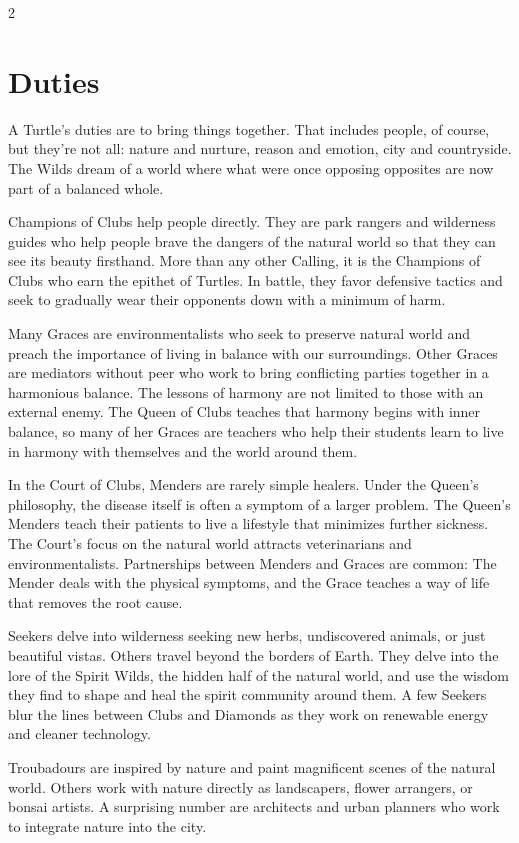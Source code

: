 \begin{multicols}{2}
\section*{Duties}
A Turtle's duties are to bring things together. That includes people, of course, but they're not all: nature and nurture, reason and emotion, city and countryside. The Wilds dream of a world where what were once opposing opposites are now part of a balanced whole. 

Champions of Clubs help people directly. They are park rangers and wilderness guides who help people brave the dangers of the natural world so that they can see its beauty firsthand. More than any other Calling, it is the Champions of Clubs who earn the epithet of Turtles. In battle, they favor defensive tactics and seek to gradually wear their opponents down with a minimum of harm. 

Many Graces are environmentalists who seek to preserve natural world and preach the importance of living in balance with our surroundings. Other Graces are mediators without peer who work to bring conflicting parties together in a harmonious balance. The lessons of harmony are not limited to those with an external enemy. The Queen of Clubs teaches that harmony begins with inner balance, so many of her Graces are teachers who help their students learn to live in harmony with themselves and the world around them. 

In the Court of Clubs, Menders are rarely simple healers. Under the Queen's philosophy, the disease itself is often a symptom of a larger problem. The Queen's Menders teach their patients to live a lifestyle that minimizes further sickness. The Court's focus on the natural world attracts veterinarians and environmentalists. Partnerships between Menders and Graces are common: The Mender deals with the physical symptoms, and the Grace teaches a way of life that removes the root cause. 

Seekers delve into wilderness seeking new herbs, undiscovered animals, or just beautiful vistas. Others travel beyond the borders of Earth. They delve into the lore of the Spirit Wilds, the hidden half of the natural world, and use the wisdom they find to shape and heal the spirit community around them. A few Seekers blur the lines between Clubs and Diamonds as they work on renewable energy and cleaner technology. 

Troubadours are inspired by nature and paint magnificent scenes of the natural world. Others work with nature directly as landscapers, flower arrangers, or bonsai artists. A surprising number are architects and urban planners who work to integrate nature into the city.


\end{multicols}
